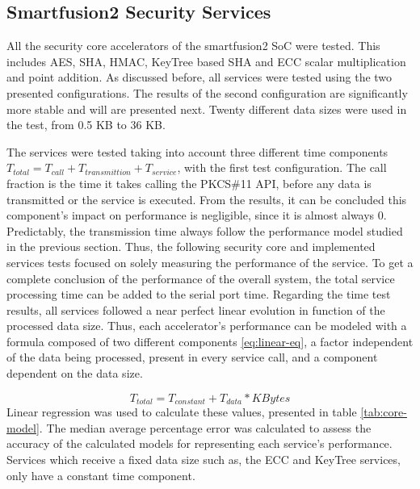 \subsection{Smartfusion2 Security Services}\label{chap:evaluation:board}

All the security core accelerators of the smartfusion2 SoC were tested. This includes \ac{AES}, \ac{SHA}, \ac{HMAC}, KeyTree based \ac{SHA} and \ac{ECC} scalar multiplication and point addition.
As discussed before, all services were tested using the two presented configurations. The results of the second configuration are significantly more stable and will are presented next.
Twenty different data sizes were used in the test, from 0.5 KB to 36 KB.

The services were tested taking into account three different time components \(T_{total} = T_{call} + T_{transmittion} + T_{service}\), with the first test configuration. The call fraction is the time it takes calling the PKCS\#11 API, before any data is transmitted or the service is executed. From the results, it can be concluded this component's impact on performance is negligible, since it is almost always 0.
Predictably, the transmission time always follow the performance model studied in the previous section.
Thus, the following security core and implemented services tests focused on solely measuring the performance of the service. To get a complete conclusion of the performance of the overall system, the total service processing time can be added to the serial port time.
Regarding the time test results, all services followed a near perfect linear evolution in function of the processed data size. Thus, each accelerator's performance can be modeled with a formula composed of two different components \ref{eq:linear-eq}, a factor independent of the data being processed, present in every service call, and a component dependent on the data size.

\begin{equation}
	\label{eq:linear-eq}
	T_{total} = T_{constant} + T_{data} * KBytes
\end{equation}
Linear regression was used to calculate these values, presented in table \ref{tab:core-model}. The median average percentage error was calculated to assess the accuracy of the calculated models for representing each service's performance. Services which receive a fixed data size such as, the \ac{ECC} and KeyTree services, only have a constant time component.

